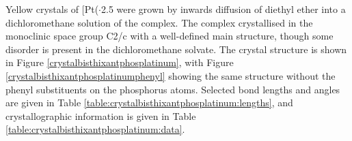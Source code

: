 Yellow crystals of [Pt(\Phthixantphos\ce{)2]}$\cdot$2.5  were grown by inwards diffusion of diethyl ether into a dichloromethane solution of the complex.  The complex crystallised in the monoclinic space group C2/c with a well-defined main structure, though some disorder is present in the dichloromethane solvate.  The crystal structure is shown in Figure \ref{crystalbisthixantphosplatinum}, with Figure \ref{crystalbisthixantphosplatinumphenyl} showing the same structure without the phenyl substituents on the phosphorus atoms.  Selected bond lengths and angles are given in Table \ref{table:crystalbisthixantphosplatinum:lengths}, and crystallographic information is given in Table \ref{table:crystalbisthixantphosplatinum:data}.  


